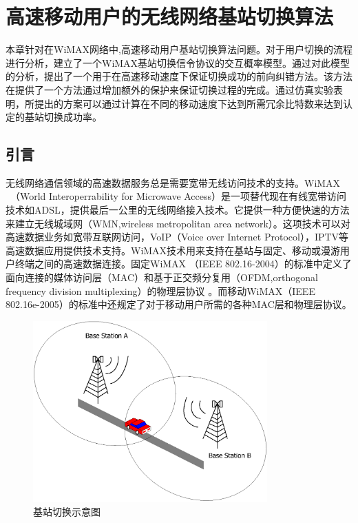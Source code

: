 \graphicspath{ {../body/handover_figures/}}
\chapter{高速移动用户的无线网络基站切换算法}
\label{chap_iccs_handover_alogrithm}
本章针对在WiMAX网络中,高速移动用户基站切换算法问题。对于用户切换的流程进行分析，建立了一个WiMAX基站切换信令协议的交互概率模型。通过对此模型的分析，提出了一个用于在高速移动速度下保证切换成功的前向纠错方法。该方法在提供了一个方法通过增加额外的保护来保证切换过程的完成。通过仿真实验表明，所提出的方案可以通过计算在不同的移动速度下达到所需冗余比特数来达到认定的基站切换成功率。

\section{引言}
\label{section_iccs_handover_algorithm_introduction}
无线网络通信领域的高速数据服务总是需要宽带无线访问技术的支持。WiMAX ~（World Interoperrability for Microwave Access）是一项替代现在有线宽带访问技术如ADSL，提供最后一公里的无线网络接入技术。它提供一种方便快速的方法来建立无线城域网（WMN,wireless metropolitan area network）。这项技术可以对高速数据业务如宽带互联网访问，VoIP（Voice over Internet Protocol），IPTV等高速数据应用提供技术支持。WiMAX技术用来支持在基站与固定、移动或漫游用户终端之间的高速数据连接。固定WiMAX （IEEE 802.16-2004）的标准中定义了面向连接的媒体访问层（MAC）和基于正交频分复用（OFDM,orthogonal frequency division multiplexing）的物理层协议 \cite{IEEE:802_16D:2005}。而移动WiMAX（IEEE 802.16e-2005）的标准中还规定了对于移动用户所需的各种MAC层和物理层协议\cite{IEEE:802_16E:2006}。

\begin{figure}[htbp]
\begin{centering}
\includegraphics[width=9cm]{../figures/iccs_handover_bs}
\caption{基站切换示意图}
\label{fig:chap_iccs_handover_bs}
\end{centering}
\end{figure}

